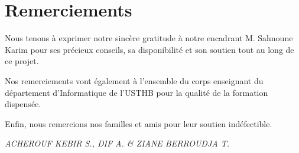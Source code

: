 
\chapter*{Remerciements}

Nous tenons à exprimer notre sincère gratitude à notre encadrant
M. Sahnoune Karim pour ses précieux conseils, sa disponibilité et son
soutien tout au long de ce projet.

Nos remerciements vont également à l'ensemble du corps enseignant du
département d'Informatique de l'USTHB pour la qualité de la formation
dispensée.

Enfin, nous remercions nos familles et amis pour leur soutien indéfectible.

\vspace{1cm}
\begin{flushright}
\textit{ACHEROUF KEBIR S., DIF A. \& ZIANE BERROUDJA T.}
\end{flushright}

\cleardoublepage
